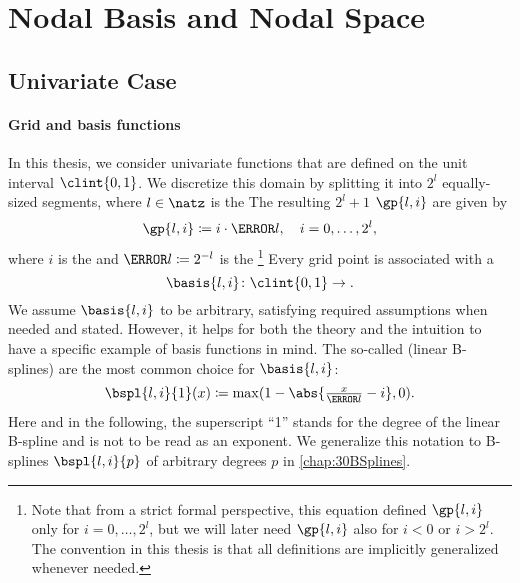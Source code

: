 \section{Nodal Basis and Nodal Space}
\label{sec:21nodalSpaces}


\mbox{}\vspace{-14mm}



\disableornamentsfornextheadingtrue
\subsection{Univariate Case}
\label{sec:211nodalUV}

\paragraph{Grid and basis functions}

In this thesis, we consider univariate functions
that are defined on the unit interval $\clint{0, 1}$.
We discretize this domain by splitting it into $2^l$ equally-sized segments,
where $l \in \natz$ is the 
The resulting $2^l + 1$  $\gp{l,i}$ are given by
\begin{equation}
  \gp{l,i} \ceq i \cdot \ms{l},\quad
  i = 0, \dotsc, 2^l,
\end{equation}
where $i$ is the  and $\ms{l} \ceq 2^{-l}$ is the %
\footnote{%
  Note that from a strict formal perspective,
  this equation defined $\gp{l,i}$ only for $i = 0, \dotsc, 2^l$,
  but we will later need $\gp{l,i}$ also for $i < 0$ or $i > 2^l$.
  The convention in this thesis is that all definitions are
  implicitly generalized whenever needed.%
}
Every grid point is associated with a 
\begin{equation}
  \basis{l,i}\colon \clint{0, 1} \to \real.
\end{equation}
We assume $\basis{l,i}$ to be arbitrary,
satisfying required assumptions when needed and stated.
However, it helps for both the theory and the intuition to have a
specific example of basis functions in mind.
The so-called  (linear B-splines)
are the most common choice for $\basis{l,i}$:
\begin{equation}
  \label{eq:hatFunctionUV}
  \bspl{l,i}{1}(x)
  \ceq \max(1 - \abs{\tfrac{x}{\ms{l}} - i}, 0).
\end{equation}
Here and in the following,
the superscript ``1'' stands for the degree of the linear B-spline and
is not to be read as an exponent.
We generalize this notation to B-splines $\bspl{l,i}{p}$ of
arbitrary degrees $p$ in \cref{chap:30BSplines}.

